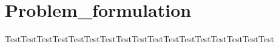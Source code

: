 \newpage
\section{Problem_formulation}


TestTestTestTestTestTestTestTestTestTestTestTestTestTestTestTestTest